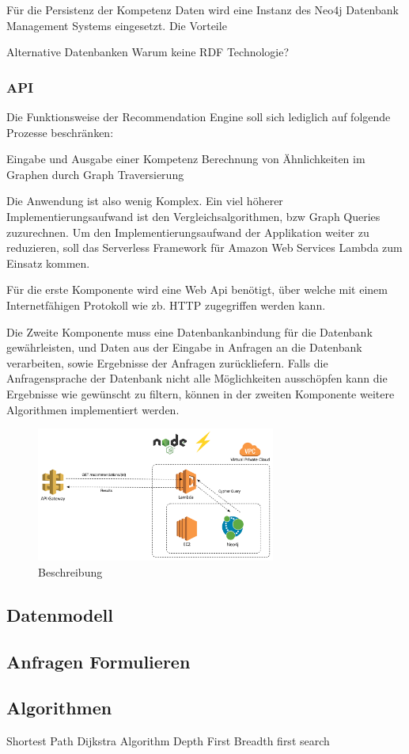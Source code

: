 Für die Persistenz der Kompetenz Daten wird eine Instanz des Neo4j Datenbank Management Systems eingesetzt. Die Vorteile 

Alternative Datenbanken
Warum keine RDF Technologie?
\subsubsection{API}

 Die Funktionsweise der Recommendation Engine soll sich lediglich auf folgende Prozesse beschränken:
 
 Eingabe und Ausgabe einer Kompetenz
Berechnung von Ähnlichkeiten im Graphen durch Graph Traversierung

Die Anwendung ist also wenig Komplex. Ein viel höherer Implementierungsaufwand ist den Vergleichsalgorithmen, bzw Graph Queries zuzurechnen. Um den Implementierungsaufwand der Applikation weiter zu reduzieren, soll das Serverless Framework für Amazon Web Services Lambda zum Einsatz kommen. 

Für die erste Komponente wird eine Web Api benötigt, über welche  mit einem Internetfähigen Protokoll wie zb. HTTP zugegriffen werden kann. 

Die Zweite Komponente muss eine Datenbankanbindung für die Datenbank gewährleisten, und Daten aus der Eingabe in Anfragen an die Datenbank verarbeiten, sowie Ergebnisse der Anfragen zurückliefern. Falls die Anfragensprache der Datenbank nicht alle Möglichkeiten ausschöpfen kann die Ergebnisse wie gewünscht zu filtern, können in der zweiten Komponente weitere Algorithmen implementiert werden.


\begin{figure}[htb]
 \centering
 \includegraphics[width=0.7\textwidth,angle=0]{abb/Architecture}
 \caption[Beschreibung]{Beschreibung}
\label{fig:Beschreibung}
\end{figure}

\subsection{Datenmodell}
\subsection{Anfragen Formulieren}
\subsection{Algorithmen}

Shortest Path
Dijkstra Algorithm
Depth First
Breadth first search
